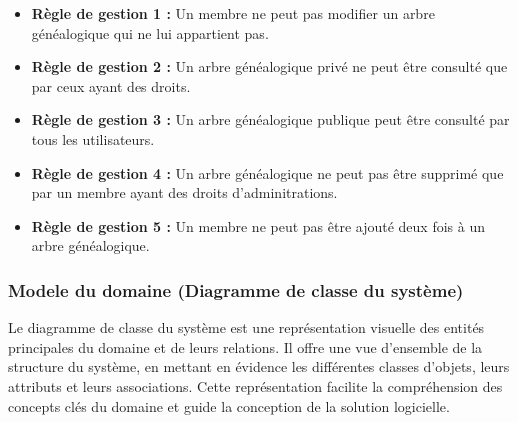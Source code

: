\begin{itemize}
  \item \textbf{Règle de gestion 1 :} Un membre ne peut pas modifier un arbre généalogique qui ne lui appartient pas.
  \item \textbf{Règle de gestion 2 :} Un arbre généalogique privé ne peut être consulté que par ceux ayant des droits.
  \item \textbf{Règle de gestion 3 :} Un arbre généalogique publique peut être consulté par tous les utilisateurs.
  \item \textbf{Règle de gestion 4 :} Un arbre généalogique ne peut pas être supprimé que par un  membre ayant des droits d'adminitrations.
  \item \textbf{Règle de gestion 5 :} Un membre ne peut pas être ajouté deux fois à un arbre généalogique.
\end{itemize}

\subsubsection{Modele du domaine (Diagramme de classe du système)}
Le diagramme de classe du système est une représentation visuelle des
entités principales du domaine et de leurs relations. Il offre une vue
d'ensemble de la structure du système, en mettant en évidence les différentes
classes d'objets, leurs attributs et leurs associations. Cette représentation
facilite la compréhension des concepts clés du domaine et guide la conception
de la solution logicielle.


